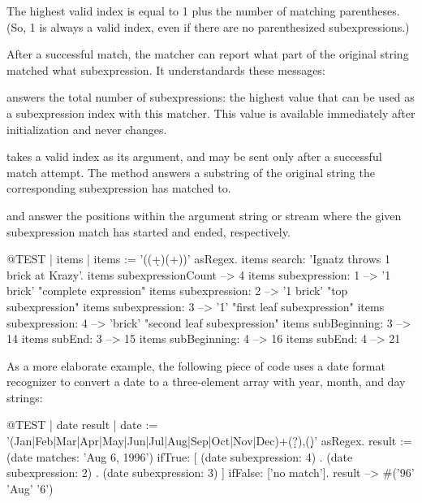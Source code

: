 \documentclass[a4paper,10pt,twoside]{book}
\begin{document}
{The highest valid index is equal to 1 plus the number of matching parentheses.  (So, 1 is always a valid index, even if there are no parenthesized subexpressions.)

After a successful match, the matcher can report what part of the original string matched what subexpression. It understandards these messages:

 answers the total number of subexpressions: the highest value that can be used as a subexpression index with this matcher. This value 	is available immediately after initialization and never changes.

 takes a valid index as its argument, and may be sent only after a successful match attempt. The method answers a substring of the original string the corresponding subexpression has matched to.

 and  answer the positions within the argument string or stream where the given subexpression match has started and ended, respectively. 

\begin{code}{@TEST | items |}
items := '((\d+)\s*(\w+))' asRegex.
items search: 'Ignatz throws 1 brick at Krazy'.
items subexpressionCount --> 4
items subexpression: 1      --> '1 brick'    "complete expression"
items subexpression: 2      --> '1 brick'    "top subexpression"
items subexpression: 3      --> '1'             "first leaf subexpression"
items subexpression: 4      --> 'brick'       "second leaf subexpression"
items subBeginning: 3       --> 14
items subEnd: 3                 --> 15
items subBeginning: 4       --> 16
items subEnd: 4                 --> 21
\end{code}

As a more elaborate example, the following piece of code uses a  date format recognizer to convert a date to a three-element array with year, month, and day strings:

\begin{code}{@TEST | date result |}
date := '(Jan|Feb|Mar|Apr|May|Jun|Jul|Aug|Sep|Oct|Nov|Dec)\s+(\d\d?)\s*,(\d\d)' asRegex.
result := (date matches: 'Aug 6, 1996')
       ifTrue: [{ (date subexpression: 4) .
				(date subexpression: 2) .
				(date subexpression: 3) } ]
        ifFalse: ['no match'].
result --> #('96' 'Aug' '6')
\end{code}

}
\end{document}
